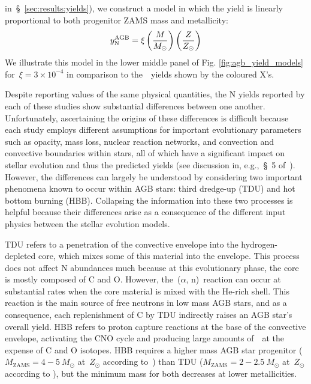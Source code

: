 \documentclass[ms.tex]{subfiles}
\begin{document}
in~\S~\ref{sec:results:yields}), we construct a model in which the yield is
linearly proportional to both progenitor ZAMS mass and metallicity:
\begin{equation}
y_\text{N}^\text{AGB} = \xi \left(\frac{M}{M_\odot}\right) \left(\frac{Z}{Z_\odot}\right)
\end{equation}
We illustrate this model in the lower middle panel of Fig.
\ref{fig:agb_yield_models} for~$\xi = 3\times10^{-4}$ in comparison to
the~\cristallo~yields shown by the coloured X's.
\par
Despite reporting values of the same physical quantities, the N yields
reported by each of these studies show substantial differences between one
another.
Unfortunately, ascertaining the origins of these differences is difficult
because each study employs different assumptions for important evolutionary
parameters such as opacity, mass loss, nuclear reaction networks, and
convection and convective boundaries within stars, all of which have a
significant impact on stellar evolution and thus the predicted yields (see
discussion in, e.g.,~\S~5 of~\citealp{Karakas2016}).
However, the differences can largely be understood by considering two important
phenomena known to occur within AGB stars: third dredge-up (TDU) and hot bottom
burning (HBB).
Collapsing the information into these two processes is helpful because their
differences arise as a consequence of the different input physics between the
stellar evolution models.
\par
TDU refers to a penetration of the convective envelope into the
hydrogen-depleted core, which mixes some of this material into the envelope.
This process does not affect N abundances much because at this evolutionary
phase, the core is mostly composed of C and O.
However, the~\Cthirteen($\alpha$, n)\Osixteen~reaction can occur at substantial
rates when the core material is mixed with the He-rich shell.
This reaction is the main source of free neutrons in low mass AGB stars, and as
a consequence, each replenishment of C by TDU indirectly raises an AGB star's
overall yield.
HBB refers to proton capture reactions at the base of the convective envelope,
activating the CNO cycle and producing large amounts of~\Nfourteen~at the
expense of C and O isotopes.
HBB requires a higher mass AGB star progenitor ($M_\text{ZAMS} = 4 - 5~M_\odot$
at~$Z_\odot$ according to~\citealt{Karakas2010}) than TDU
($M_\text{ZAMS} = 2 - 2.5~M_\odot$ at~$Z_\odot$ according to
\citealt{Karakas2010}), but the minimum mass for both decreases at lower
metallicities.
\par
\end{document}

